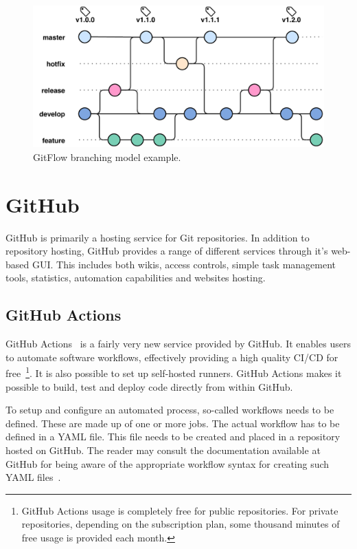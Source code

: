 \begin{figure}[h]
    \centering
    \includegraphics[page=1,width=\textwidth]{sections/theory/figures/gitflow.pdf}
    \caption{GitFlow branching model example.}
    \label{fig:gitflow}
\end{figure}

\section{GitHub}
GitHub is primarily a hosting service for Git repositories. In addition to repository hosting, GitHub provides a range of different services through it's web-based GUI. This includes both wikis, access controls, simple task management tools, statistics, automation capabilities and websites hosting.

\subsection{GitHub Actions}
\label{sec:theory-github-actions}
GitHub Actions~\cite{github-actions} is a fairly very new service provided by GitHub. It enables users to automate software workflows, effectively providing a high quality CI/CD for free~\footnote{GitHub Actions usage is completely free for public repositories. For private repositories, depending on the subscription plan, some thousand minutes of free usage is provided each month.}. It is also possible to set up self-hosted runners. GitHub Actions makes it possible to build, test and deploy code directly from within GitHub.

To setup and configure an automated process, so-called workflows needs to be defined. These are made up of one or more jobs. The actual workflow has to be defined in a YAML file. This file needs to be created and placed in a repository hosted on GitHub. The reader may consult the documentation available at GitHub for being aware of the appropriate workflow syntax for creating such YAML files~\cite{github-actions-workflow-syntax}.

